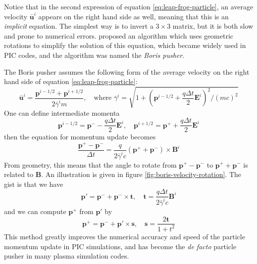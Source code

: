 Notice that in the second expression of equation \eqref{eq:leap-frog-particle},
an average velocity $\bar{\mathbf{u}}^{i}$ appears on the right hand side as
well, meaning that this is an {\it implicit} equation. The simplest way is to
invert a $3\times 3$ matrix, but it is both slow and prone to numerical errors.
\citet{boris_relativistic_1970} proposed an algorithm which uses geometric rotations to
simplify the solution of this equation, which became widely used in PIC codes,
and the algorithm was named the {\it Boris pusher}.

The Boris pusher assumes the following form of the average velocity on the right
hand side of equation \eqref{eq:leap-frog-particle}:
\begin{equation}
  \label{eq:boris-average-u}
  \bar{\mathbf{u}}^{i} = \frac{\mathbf{p}^{i-1/2} + \mathbf{p}^{i+1/2}}{2\bar{\gamma}^im},\quad \text{where } \bar{\gamma}^i = \sqrt{1 + \left( \mathbf{p}^{i-1/2} + \frac{q\Delta t}{2}\mathbf{E}^i \right)^2/(mc)^2}
\end{equation}
One can define intermediate momenta
\begin{equation}
  \label{eq:boris-intermediate-momenta}
  \mathbf{p}^{i-1/2} = \mathbf{p}^{-} - \frac{q\Delta t}{2}\mathbf{E}^{i},\quad \mathbf{p}^{i+1/2} = \mathbf{p}^{+} + \frac{q\Delta t}{2}\mathbf{E}^i
\end{equation}
then the equation for momentum update becomes
\begin{equation}
  \label{eq:boris-momentum-update}
  \frac{\mathbf{p}^+-\mathbf{p}^{-}}{\Delta t} = \frac{q}{2 \bar{\gamma}^ic}(\mathbf{p}^+ + \mathbf{p}^{-})\times \mathbf{B}^{i}
\end{equation}
From geometry, this means that the angle to rotate from
$\mathbf{p}^+-\mathbf{p}^{-}$ to $\mathbf{p}^++\mathbf{p}^{-}$ is related to
$\mathbf{B}$. An illustration is given in figure
\ref{fig:boris-velocity-rotation}. The gist is that we have
\begin{equation}
  \mathbf{p}' = \mathbf{p}^{-} + \mathbf{p}^{-}\times \mathbf{t},\quad \mathbf{t} = \frac{q\Delta t}{2\bar{\gamma}^ic}\mathbf{B}^{i}
\end{equation}
and we can compute $\mathbf{p}^{+}$ from $\mathbf{p}'$ by
\begin{equation}
  \mathbf{p}^+ = \mathbf{p}^{-} + \mathbf{p}'\times \mathbf{s},\quad \mathbf{s} = \frac{2\mathbf{t}}{1 + t^2}
\end{equation}
This method greatly improves the numerical accuracy and speed of the particle
momentum update in PIC simulations, and has become the {\it de facto} particle
pusher in many plasma simulation codes.

